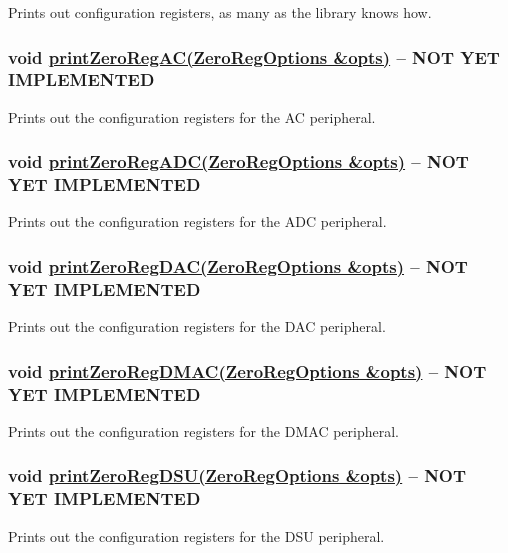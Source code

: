 Prints out configuration registers, as many as the library knows how.

\subsubsection*{void \hyperlink{_zero_regs_8h_a147a30d688c41a0d39922ca6d2cd6bfb}{print\+Zero\+Reg\+A\+C(\+Zero\+Reg\+Options \&opts)} -- {\bfseries N\+OT Y\+ET I\+M\+P\+L\+E\+M\+E\+N\+T\+ED}}

Prints out the configuration registers for the {\ttfamily AC} peripheral.

\subsubsection*{void \hyperlink{_zero_regs_8h_a67d77c008fc2ce98d2d78168aa64e9d8}{print\+Zero\+Reg\+A\+D\+C(\+Zero\+Reg\+Options \&opts)} -- {\bfseries N\+OT Y\+ET I\+M\+P\+L\+E\+M\+E\+N\+T\+ED}}

Prints out the configuration registers for the {\ttfamily A\+DC} peripheral.

\subsubsection*{void \hyperlink{_zero_regs_8h_a1095e7bbe04b7d3f6b4d58d8e7a42df8}{print\+Zero\+Reg\+D\+A\+C(\+Zero\+Reg\+Options \&opts)} -- {\bfseries N\+OT Y\+ET I\+M\+P\+L\+E\+M\+E\+N\+T\+ED}}

Prints out the configuration registers for the {\ttfamily D\+AC} peripheral.

\subsubsection*{void \hyperlink{_zero_regs_8h_a9a5372cd2135bb853cfdbf3db45dd79c}{print\+Zero\+Reg\+D\+M\+A\+C(\+Zero\+Reg\+Options \&opts)} -- {\bfseries N\+OT Y\+ET I\+M\+P\+L\+E\+M\+E\+N\+T\+ED}}

Prints out the configuration registers for the {\ttfamily D\+M\+AC} peripheral.

\subsubsection*{void \hyperlink{_zero_regs_8h_a06b2995104e4c1cbc2f61e11e3a3e484}{print\+Zero\+Reg\+D\+S\+U(\+Zero\+Reg\+Options \&opts)} -- {\bfseries N\+OT Y\+ET I\+M\+P\+L\+E\+M\+E\+N\+T\+ED}}

Prints out the configuration registers for the {\ttfamily D\+SU} peripheral.

